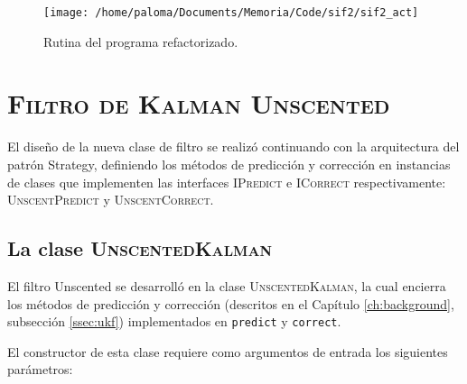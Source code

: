 \begin{figure}
\centering
\texttt{[image: /home/paloma/Documents/Memoria/Code/sif2/sif2\_act]}
\caption{Rutina del programa refactorizado.}
\label{fig:new_routine}
\end{figure}  


\section{\textsc{Filtro de Kalman Unscented}}
El dise\~no de la nueva clase de filtro se realiz\'o continuando con la arquitectura del patr\'on Strategy, definiendo los m\'etodos de predicci\'on y correcci\'on en instancias de clases que implementen las interfaces \textsc{IPredict} e \textsc{ICorrect} respectivamente: \textsc{UnscentPredict} y \textsc{UnscentCorrect}.

\subsection{La clase \textsc{UnscentedKalman}}

El filtro Unscented se desarroll\'o en la clase \textsc{UnscentedKalman}, la cual encierra los m\'etodos de predicci\'on y correcci\'on (descritos en el Cap\'itulo \ref{ch:background}, subsecci\'on \ref{ssec:ukf}) implementados en \texttt{predict} y \texttt{correct}.
\bigskip

El constructor de esta clase requiere como argumentos de entrada los siguientes par\'ametros:

